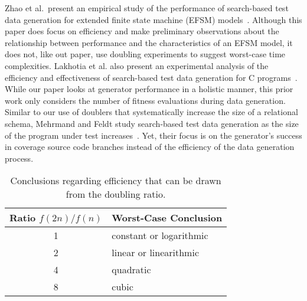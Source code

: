 Zhao et al.\ present an empirical study of the performance of search-based test data generation for extended finite
state machine (EFSM) models~\cite{zhao2010}. Although this paper does focus on efficiency and make preliminary
observations about the relationship between performance and the characteristics of an EFSM model, it does not, like out
paper, use doubling experiments to suggest worst-case time complexities. Lakhotia et al. also present an experimental
analysis of the efficiency and effectiveness of search-based test data generation for C programs~\cite{lakhotia2013}.
While our paper looks at generator performance in a holistic manner, this prior work only considers the number of
fitness evaluations during data generation. Similar to our use of doublers that systematically increase the size of a
relational schema, Mehrmand and Feldt study search-based test data generation as the size of the
program under test increases~\cite{mehrmand2010}. Yet, their focus is on the generator's success in coverage source code
branches instead of the efficiency of the data generation process.



\begin{table}[t]

  \begin{center}

    \begin{tabular}{c|l}
      Ratio $f(2n)/f(n)$ & Worst-Case Conclusion              \\ \hline
      1                  & constant or logarithmic \\
      2                  & linear or linearithmic  \\
      4                  & quadratic               \\
      8                  & cubic                   \\
    \end{tabular}

  \end{center}
  \vspace*{-.15in}

  \caption{Conclusions regarding efficiency that can be drawn from the doubling ratio.}\label{table:ratios}
  \vspace*{-.30in}

\end{table}
